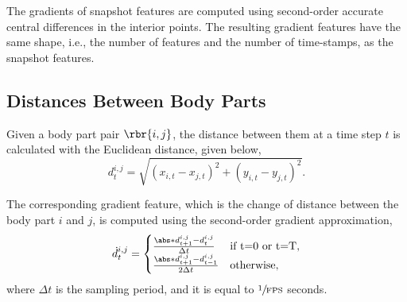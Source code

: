 The gradients of snapshot features are computed using second-order accurate central differences in the interior points.
The resulting gradient features have the same shape, i.e., the number of features and the number of time-stamps, as the snapshot features.

\subsection{Distances Between Body Parts}
Given a body part pair $\rbr{i,j}$, the distance between them at a time step $t$ is calculated with the Euclidean distance, given below,
\begin{equation}
	d^{i,j}_t = \sqrt{(x_{i,t} - x_{j,t})^2 + (y_{i,t} - y_{j,t})^2}.
\end{equation}

The corresponding gradient feature,  which is the change of distance between the body part $i$ and $j$, is computed using the second-order gradient approximation,
\begin{equation}
	\dot{d}^{i,j}_t = \begin{cases} \frac{\abs*{d^{i,j}_{t+1} - d^{i,j}_{t}}}{\Delta t} & \textnormal{if } $t=0$ \textnormal{ or } $t=T$, \\ \frac{\abs*{d^{i,j}_{t+1} - d^{i,j}_{t-1}}}{2\Delta t} & \textnormal{otherwise}, \end{cases}
\end{equation}
where $\Delta t$ is the sampling period, and it is equal to $\sfrac{1}{\textnormal{FPS}}$ seconds.

